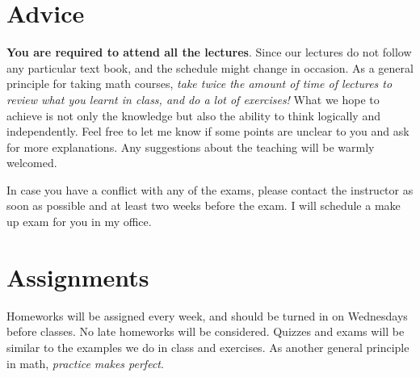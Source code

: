 \documentclass[margin,line]{res}
\newenvironment{list2}{
  \begin{list}{$\bullet$}{%
      \setlength{\itemsep}{0in}
      \setlength{\parsep}{0in} \setlength{\parskip}{0in}
      \setlength{\topsep}{0in} \setlength{\partopsep}{0in}
      \setlength{\leftmargin}{0.2in}}}{\end{list}}
\begin{document}
\begin{resume}
\begin{enumerate}
\end{enumerate}

\section{\sc Advice}
{\bf You are required to attend all the lectures}. Since our
lectures do not follow any particular text book, and the
schedule might change in occasion. As a general principle for
taking math courses, \emph{take twice the amount of time of lectures
to review what you learnt in class, and do a lot of exercises!} What
we hope to achieve is not only the knowledge but also the ability
to think logically and independently. Feel free to let me know if
some points are unclear to you and ask for more explanations. Any
suggestions about the teaching will be warmly welcomed.

In case you have a conflict with any of the exams, please contact the
instructor as soon as possible and at least two weeks before the
exam. I will schedule a make up exam for you in my office.


\section{\sc Assignments}
Homeworks will be assigned every week, and should
be turned in on Wednesdays before classes. No late homeworks will be considered.
Quizzes and exams will be similar to the examples we
do in class and exercises. As another general principle in math,
\emph{practice makes perfect}.


\end{resume}
\end{document}
